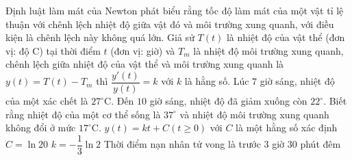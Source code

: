 \begin{ex}%
	Định luật làm mát của Newton phát biểu rằng tốc độ làm mát của một vật tỉ lệ thuận với chênh lệch nhiệt độ giữa vật đó và môi trường xung quanh, với điều kiện là chênh lệch này không quá lớn. Giả sử $T(t)$ là nhiệt độ của vật thể (đơn vị: độ C) tại thời điểm $t$ (đơn vị: giờ) và $T_m$ là nhiệt độ môi trường xung quanh, chênh lệch giữa nhiệt độ của vật thể và môi trường xung quanh là $y(t)=T(t)-T_m$ thì $\dfrac{y'(t)}{y(t)}=k$ với $k$ là hằng số. Lúc $7$ giờ sáng, nhiệt độ của một xác chết là $27^\circ$C. Đến $10$ giờ sáng, nhiệt độ đã giảm xuống còn $22^\circ$. Biết rằng nhiệt độ của một cơ thể sống là $37^\circ$ và nhiệt độ môi trường xung quanh không đổi ở mức $17^\circ$C.
	\choiceTF
	{$y(t)=kt+C (t\geq 0)$ với $C$ là một hằng số xác định}
	{\True $C=\ln 20$}
	{\True $k=-\dfrac{1}{3}\ln 2$}
	{Thời điểm nạn nhân tử vong là trước $3$ giờ $30$ phút đêm}
\end{ex}
